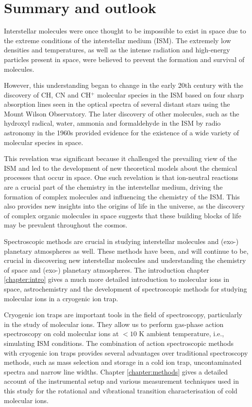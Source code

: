 \chapter{Summary and outlook}
Interstellar molecules were once thought to be impossible to exist in space due to the extreme conditions of the interstellar medium (ISM). The extremely low densities and temperatures, as well as the intense radiation and high-energy particles present in space, were believed to prevent the formation and survival of molecules.

However, this understanding began to change in the early 20th century with the discovery of CH, CN and CH$^+$ molecular species in the ISM based on four sharp absorption lines seen in the optical spectra of several distant stars using the Mount Wilson Observatory. The later discovery of other molecules, such as the hydroxyl radical, water, ammonia and formaldehyde in the ISM by radio astronomy in the 1960s provided evidence for the existence of a wide variety of molecular species in space.

This revelation was significant because it challenged the prevailing view of the ISM and led to the development of new theoretical models about the chemical processes that occur in space. One such revelation is that ion-neutral reactions are a crucial part of the chemistry in the interstellar medium, driving the formation of complex molecules and influencing the chemistry of the ISM. This also provides new insights into the origins of life in the universe, as the discovery of complex organic molecules in space suggests that these building blocks of life may be prevalent throughout the cosmos.

Spectroscopic methods are crucial in studying interstellar molecules and (exo-) planetary atmospheres as well. These methods have been, and will continue to be, crucial in discovering new interstellar molecules and understanding the chemistry of space and (exo-) planetary atmospheres. The introduction chapter \ref{chapter:intro} gives a much more detailed introduction to molecular ions in space, astrochemistry and the development of spectroscopic methods for studying molecular ions in a cryogenic ion trap.

Cryogenic ion traps are important tools in the field of spectroscopy, particularly in the study of molecular ions. They allow us to perform gas-phase action spectroscopy on cold molecular ions at $< 10$ K ambient temperature, i.e., simulating ISM conditions. The combination of action spectroscopic methods with cryogenic ion traps provides several advantages over traditional spectroscopy methods, such as mass selection and storage in a cold ion trap, uncontaminated spectra and narrow line widths. Chapter \ref{chapter:methods} gives a detailed account of the instrumental setup and various measurement techniques used in this study for the rotational and vibrational transition characterisation of cold molecular ions.

